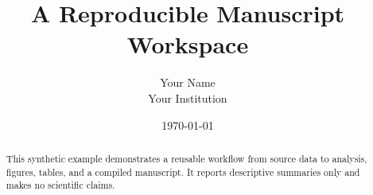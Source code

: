 \documentclass[11pt,a4paper]{article}
\title{A Reproducible Manuscript Workspace}
\author{Your Name\\Your Institution}
\date{\today}
\begin{document}
\maketitle
\begin{abstract}
This synthetic example demonstrates a reusable workflow from source data to
analysis, figures, tables, and a compiled manuscript. It reports descriptive
summaries only and makes no scientific claims.
\end{abstract}







\end{document}
